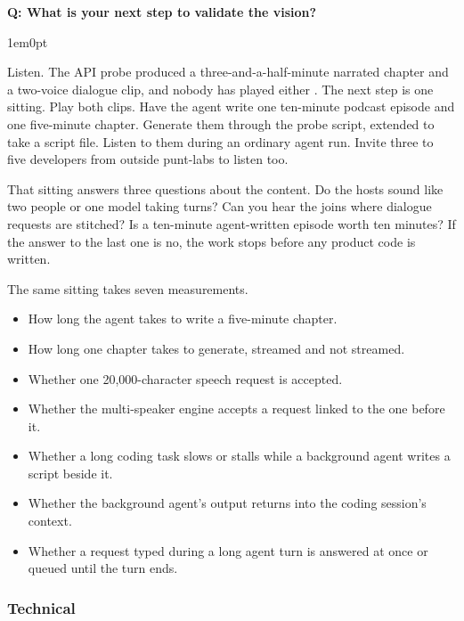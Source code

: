 \documentclass[11pt,letterpaper]{article} %
\newcounter{faqnum} %
\newenvironment{faqpair}[1]{%
  \needspace{4\baselineskip}%
  \vspace{0.5em}%
  \refstepcounter{faqnum}%
  \noindent\textbf{\color{SectionBlue}Q\thefaqnum: #1}\par\nopagebreak[4]%
  \vspace{0.2em}%
  \begin{adjustwidth}{1em}{0pt}%
  \setlength{\parindent}{0pt}%
  \setlength{\parskip}{0.5em}%
}{%
  \end{adjustwidth}%
  \vspace{0.5em}%
}
\begin{document}
\begin{faqpair}{What is your next step to validate the vision?}\label{faq:validation-plan}

  Listen. The API probe produced a three-and-a-half-minute narrated chapter
  and a two-voice dialogue clip, and nobody has played either
  \cite{voxspike2026audiobook}. The next step is one sitting. Play both
  clips. Have the agent write one ten-minute podcast episode and one
  five-minute chapter. Generate them through the probe script, extended to
  take a script file. Listen to them during an ordinary agent run. Invite
  three to five developers from outside punt-labs to listen too.

  That sitting answers three questions about the content. Do the hosts
  sound like two people or one model taking turns? Can you hear the joins
  where dialogue requests are stitched? Is a ten-minute agent-written
  episode worth ten minutes? If the answer to the last one is no, the work
  stops before any product code is written.

  The same sitting takes seven measurements.

  \begin{itemize}[leftmargin=1.5em, nosep]
    \item How long the agent takes to write a five-minute chapter.

    \item How long one chapter takes to generate, streamed and not
          streamed.

    \item Whether one 20,000-character speech request is accepted.

    \item Whether the multi-speaker engine accepts a request linked to the
          one before it.

    \item Whether a long coding task slows or stalls while a background
          agent writes a script beside it.

    \item Whether the background agent's output returns into the coding
          session's context.

    \item Whether a request typed during a long agent turn is answered at
          once or queued until the turn ends.
  \end{itemize}
\end{faqpair}

\subsubsection*{Technical}
\end{document}
